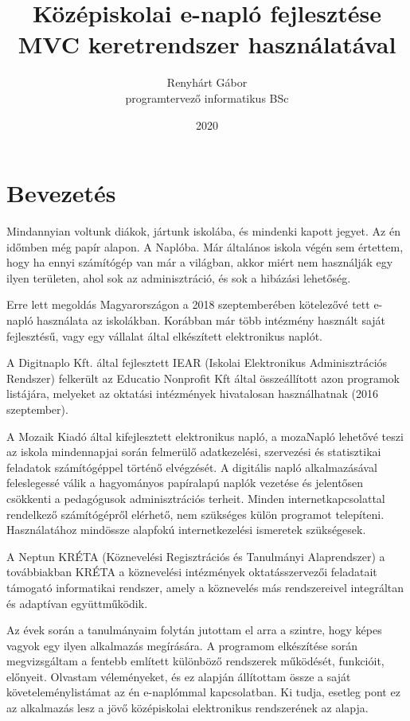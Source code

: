 \documentclass[
]{thesis-ekf}
\begin{document}
\title{Középiskolai e-napló fejlesztése MVC keretrendszer használatával}
\author{Renyhárt Gábor\\programtervező informatikus BSc}
\date{2020}
\maketitle

\tableofcontents

\chapter*{Bevezetés}
Mindannyian voltunk diákok, jártunk iskolába, és mindenki kapott jegyet. Az én időmben még papír alapon. A Naplóba. Már általános iskola végén sem értettem, hogy ha ennyi számítógép van már a világban, akkor miért nem használják egy ilyen területen, ahol sok az adminisztráció, és sok a hibázási lehetőség.

Erre lett megoldás Magyarországon a 2018 szeptemberében kötelezővé tett e-napló használata az iskolákban. Korábban már több intézmény használt saját fejlesztésű, vagy egy vállalat által elkészített elektronikus naplót.

A Digitnaplo Kft. által fejlesztett IEAR (Iskolai Elektronikus Adminisztrációs Rendszer) felkerült az Educatio Nonprofit Kft által összeállított azon programok listájára, melyeket az oktatási intézmények hivatalosan használhatnak (2016 szeptember).

A Mozaik Kiadó által kifejlesztett elektronikus napló, a mozaNapló lehetővé teszi az iskola mindennapjai során felmerülő adatkezelési, szervezési és statisztikai feladatok számítógéppel történő elvégzését. A digitális napló alkalmazásával feleslegessé válik a hagyományos papíralapú naplók vezetése és jelentősen csökkenti a pedagógusok adminisztrációs terheit. Minden internetkapcsolattal rendelkező számítógépről elérhető, nem szükséges külön programot telepíteni. Használatához mindössze alapfokú internetkezelési ismeretek szükségesek.

A Neptun KRÉTA (Köznevelési Regisztrációs és Tanulmányi Alaprendszer) a továbbiakban KRÉTA a köznevelési intézmények oktatásszervezői feladatait támogató informatikai rendszer, amely a köznevelés más rendszereivel integráltan és adaptívan együttműködik. 

Az évek során a tanulmányaim folytán jutottam el arra a szintre, hogy képes vagyok egy ilyen alkalmazás megírására. A programom elkészítése során megvizsgáltam a fentebb említett különböző rendszerek működését, funkcióit, előnyeit. Olvastam véleményeket, és ez alapján állítottam össze a saját követeleménylistámat az én e-naplómmal kapcsolatban.
Ki tudja, esetleg pont ez az alkalmazás lesz a jövő középiskolai elektronikus rendszerének az alapja.
\end{document}
